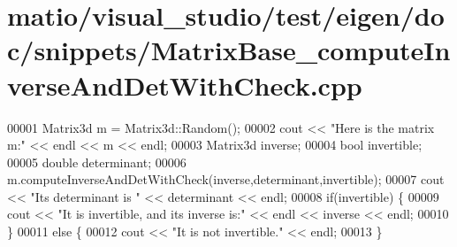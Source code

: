 \hypertarget{matio_2visual__studio_2test_2eigen_2doc_2snippets_2_matrix_base__compute_inverse_and_det_with_check_8cpp_source}{}\section{matio/visual\+\_\+studio/test/eigen/doc/snippets/\+Matrix\+Base\+\_\+compute\+Inverse\+And\+Det\+With\+Check.cpp}
\label{matio_2visual__studio_2test_2eigen_2doc_2snippets_2_matrix_base__compute_inverse_and_det_with_check_8cpp_source}

\begin{DoxyCode}
00001 Matrix3d m = Matrix3d::Random();
00002 cout << \textcolor{stringliteral}{"Here is the matrix m:"} << endl << m << endl;
00003 Matrix3d inverse;
00004 \textcolor{keywordtype}{bool} invertible;
00005 \textcolor{keywordtype}{double} determinant;
00006 m.computeInverseAndDetWithCheck(inverse,determinant,invertible);
00007 cout << \textcolor{stringliteral}{"Its determinant is "} << determinant << endl;
00008 \textcolor{keywordflow}{if}(invertible) \{
00009   cout << \textcolor{stringliteral}{"It is invertible, and its inverse is:"} << endl << inverse << endl;
00010 \}
00011 \textcolor{keywordflow}{else} \{
00012   cout << \textcolor{stringliteral}{"It is not invertible."} << endl;
00013 \}
\end{DoxyCode}

